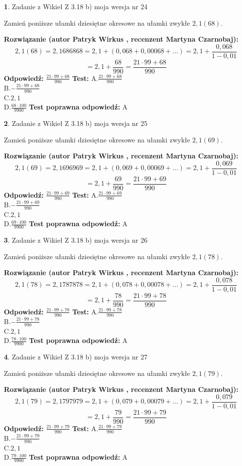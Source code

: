 \documentclass[12pt, a4paper]{article}
\theoremstyle{definition} %
\newtheorem{zad}{}
\newcommand{\zadStart}[1]{\begin{zad}#1\newline}
\newcommand{\zadStop}{\end{zad}}
\newcommand{\rozwStart}[2]{\noindent \textbf{Rozwiązanie (autor #1 , recenzent #2): }\newline}
\newcommand{\rozwStop}{\newline}
\newcommand{\odpStart}{\noindent \textbf{Odpowiedź:}\newline}
\newcommand{\odpStop}{\newline}
\newcommand{\testStart}{\noindent \textbf{Test:}\newline}
\newcommand{\testStop}{\newline}
\newcommand{\kluczStart}{\noindent \textbf{Test poprawna odpowiedź:}\newline}
\newcommand{\kluczStop}{\newline}
\begin{document}
\zadStart{Zadanie z Wikieł Z 3.18 b) moja wersja nr 24}

Zamień poniższe ułamki dziesiętne okresowe na ułamki zwykłe $2,1(68)$.
\zadStop
\rozwStart{Patryk Wirkus}{Martyna Czarnobaj}
$$2,1(68)=2,1686868=2,1+(0,068+0,00068+...)=2,1+\frac{0,068}{1-0,01}$$
$$=2,1+\frac{68}{990}=\frac{21\cdot99+68}{990}$$
\rozwStop
\odpStart
$\frac{21\cdot99+68}{990}$
\odpStop
\testStart
A.$\frac{21\cdot99+68}{990}$\\ B.$-\frac{21\cdot99+68}{990}$\\ C.$2,1$\\ D.$\frac{68\cdot100}{9900}$
\testStop
\kluczStart
A
\kluczStop



\zadStart{Zadanie z Wikieł Z 3.18 b) moja wersja nr 25}

Zamień poniższe ułamki dziesiętne okresowe na ułamki zwykłe $2,1(69)$.
\zadStop
\rozwStart{Patryk Wirkus}{Martyna Czarnobaj}
$$2,1(69)=2,1696969=2,1+(0,069+0,00069+...)=2,1+\frac{0,069}{1-0,01}$$
$$=2,1+\frac{69}{990}=\frac{21\cdot99+69}{990}$$
\rozwStop
\odpStart
$\frac{21\cdot99+69}{990}$
\odpStop
\testStart
A.$\frac{21\cdot99+69}{990}$\\ B.$-\frac{21\cdot99+69}{990}$\\ C.$2,1$\\ D.$\frac{69\cdot100}{9900}$
\testStop
\kluczStart
A
\kluczStop



\zadStart{Zadanie z Wikieł Z 3.18 b) moja wersja nr 26}

Zamień poniższe ułamki dziesiętne okresowe na ułamki zwykłe $2,1(78)$.
\zadStop
\rozwStart{Patryk Wirkus}{Martyna Czarnobaj}
$$2,1(78)=2,1787878=2,1+(0,078+0,00078+...)=2,1+\frac{0,078}{1-0,01}$$
$$=2,1+\frac{78}{990}=\frac{21\cdot99+78}{990}$$
\rozwStop
\odpStart
$\frac{21\cdot99+78}{990}$
\odpStop
\testStart
A.$\frac{21\cdot99+78}{990}$\\ B.$-\frac{21\cdot99+78}{990}$\\ C.$2,1$\\ D.$\frac{78\cdot100}{9900}$
\testStop
\kluczStart
A
\kluczStop



\zadStart{Zadanie z Wikieł Z 3.18 b) moja wersja nr 27}

Zamień poniższe ułamki dziesiętne okresowe na ułamki zwykłe $2,1(79)$.
\zadStop
\rozwStart{Patryk Wirkus}{Martyna Czarnobaj}
$$2,1(79)=2,1797979=2,1+(0,079+0,00079+...)=2,1+\frac{0,079}{1-0,01}$$
$$=2,1+\frac{79}{990}=\frac{21\cdot99+79}{990}$$
\rozwStop
\odpStart
$\frac{21\cdot99+79}{990}$
\odpStop
\testStart
A.$\frac{21\cdot99+79}{990}$\\ B.$-\frac{21\cdot99+79}{990}$\\ C.$2,1$\\ D.$\frac{79\cdot100}{9900}$
\testStop
\kluczStart
A
\kluczStop
\end{document}
